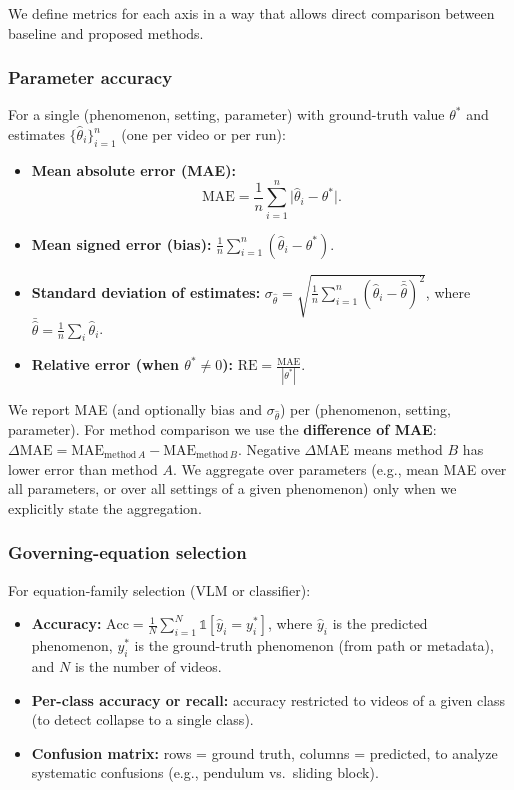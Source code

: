 We define metrics for each axis in a way that allows direct comparison between baseline and proposed methods.

\subsubsection{Parameter accuracy}
\label{sec:metrics_param}

For a single (phenomenon, setting, parameter) with ground-truth value $\theta^*$ and estimates $\{\hat{\theta}_i\}_{i=1}^n$ (one per video or per run):

\begin{itemize}[noitemsep]
  \item \textbf{Mean absolute error (MAE):}
  \begin{equation}
    \mathrm{MAE} = \frac{1}{n} \sum_{i=1}^{n} \bigl| \hat{\theta}_i - \theta^* \bigr|.
  \end{equation}
  \item \textbf{Mean signed error (bias):}
  $\displaystyle \frac{1}{n} \sum_{i=1}^{n} (\hat{\theta}_i - \theta^*)$.
  \item \textbf{Standard deviation of estimates:}
  $\displaystyle \sigma_{\hat{\theta}} = \sqrt{\frac{1}{n}\sum_{i=1}^{n} (\hat{\theta}_i - \bar{\hat{\theta}})^2}$, where $\bar{\hat{\theta}} = \frac{1}{n}\sum_i \hat{\theta}_i$.
  \item \textbf{Relative error (when $\theta^* \neq 0$):}
  $\displaystyle \mathrm{RE} = \frac{\mathrm{MAE}}{|\theta^*|}$.
\end{itemize}

We report MAE (and optionally bias and $\sigma_{\hat{\theta}}$) per (phenomenon, setting, parameter). For method comparison we use the \textbf{difference of MAE}: $\Delta\mathrm{MAE} = \mathrm{MAE}_{\mathrm{method}\,A} - \mathrm{MAE}_{\mathrm{method}\,B}$. Negative $\Delta\mathrm{MAE}$ means method $B$ has lower error than method $A$. We aggregate over parameters (e.g., mean MAE over all parameters, or over all settings of a given phenomenon) only when we explicitly state the aggregation.

\subsubsection{Governing-equation selection}
\label{sec:metrics_eq}

For equation-family selection (VLM or classifier):

\begin{itemize}[noitemsep]
  \item \textbf{Accuracy:}
  $\displaystyle \mathrm{Acc} = \frac{1}{N} \sum_{i=1}^{N} \mathbb{1}[\hat{y}_i = y_i^*]$, where $\hat{y}_i$ is the predicted phenomenon, $y_i^*$ is the ground-truth phenomenon (from path or metadata), and $N$ is the number of videos.
  \item \textbf{Per-class accuracy or recall:} accuracy restricted to videos of a given class (to detect collapse to a single class).
  \item \textbf{Confusion matrix:} rows = ground truth, columns = predicted, to analyze systematic confusions (e.g., pendulum vs.\ sliding block).
\end{itemize}

